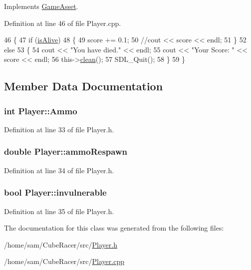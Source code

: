 Implements \hyperlink{classGameAsset_a42688ec8f02e201eaaa01e74a112083f}{Game\-Asset}.



Definition at line 46 of file Player.\-cpp.


\begin{DoxyCode}
46                     \{
47   \textcolor{keywordflow}{if} (\hyperlink{classGameAsset_aebf93ae52dc7fabbb6ec7edaadf915d0}{isAlive}) 
48   \{
49     score += 0.1;
50     \textcolor{comment}{//cout << score << endl;}
51   \}
52   \textcolor{keywordflow}{else}
53   \{ 
54     cout << \textcolor{stringliteral}{"You have died."} << endl;
55     cout << \textcolor{stringliteral}{"Your Score: "} << score << endl;
56     this->\hyperlink{classPlayer_a883c81df5be3b931ecfa6c8de08acfbd}{clean}();
57     SDL\_Quit();
58   \}
59 \}
\end{DoxyCode}


\subsection{Member Data Documentation}
\hypertarget{classPlayer_a689b73da19dd6d6932ffeb5d766709e6}{
\subsubsection[{Ammo}]{\setlength{\rightskip}{0pt plus 5cm}int Player\-::\-Ammo}}\label{classPlayer_a689b73da19dd6d6932ffeb5d766709e6}


Definition at line 33 of file Player.\-h.

\hypertarget{classPlayer_a38b0bf5bc8ff6e571922d4b51d2aa291}{
\subsubsection[{ammo\-Respawn}]{\setlength{\rightskip}{0pt plus 5cm}double Player\-::ammo\-Respawn}}\label{classPlayer_a38b0bf5bc8ff6e571922d4b51d2aa291}


Definition at line 34 of file Player.\-h.

\hypertarget{classPlayer_a16e6b8b49d2f4433e07db406cea1fea5}{
\subsubsection[{invulnerable}]{\setlength{\rightskip}{0pt plus 5cm}bool Player\-::invulnerable}}\label{classPlayer_a16e6b8b49d2f4433e07db406cea1fea5}


Definition at line 35 of file Player.\-h.



The documentation for this class was generated from the following files\-:\begin{DoxyCompactItemize}
\item 
/home/sam/\-Cube\-Racer/src/\hyperlink{Player_8h}{Player.\-h}\item 
/home/sam/\-Cube\-Racer/src/\hyperlink{Player_8cpp}{Player.\-cpp}\end{DoxyCompactItemize}
